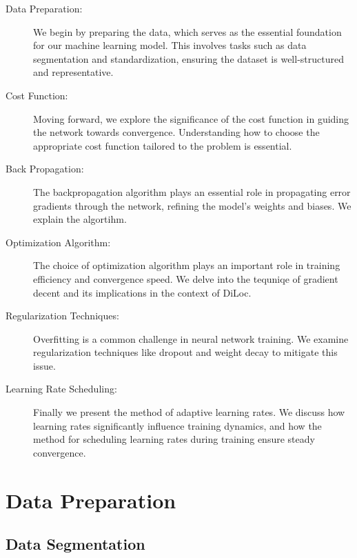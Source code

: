 \documentclass[a4paper, UKenglish, 11pt]{uiomaster}
\begin{document}
\begin{description}
   \item [Data Preparation:] We begin by preparing the data, which serves as the essential foundation for our machine learning model. This involves tasks such as data segmentation and standardization, ensuring the dataset is well-structured and representative.

   \item [Cost Function:] Moving forward, we explore the significance of the cost function in guiding the network towards convergence. Understanding how to choose the appropriate cost function tailored to the problem is essential.

   \item[Back Propagation:] The backpropagation algorithm plays an essential role in propagating error gradients through the network, refining the model's weights and biases. We explain the algortihm.

   \item[Optimization Algorithm:] The choice of optimization algorithm plays an important role in training efficiency and convergence speed. We delve into the tequniqe of gradient decent and its implications in the context of DiLoc.

   \item[Regularization Techniques:] Overfitting is a common challenge in neural network training. We examine regularization techniques like dropout and weight decay to mitigate this issue.

   \item[Learning Rate Scheduling:] Finally we present the method of adaptive learning rates. We discuss how learning rates significantly influence training dynamics, and how the method for scheduling learning rates during training ensure steady convergence.

\end{description}

\section{Data Preparation}
\subsection{Data Segmentation}
\end{document}
